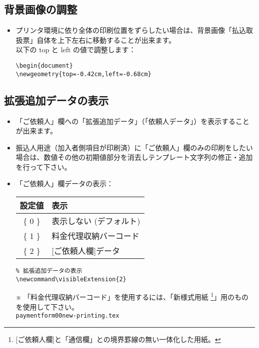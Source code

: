\documentclass[a4paper,10pt,titlepage]{ltjsarticle}
\def\colH#1{\color[HTML]{#1}}
\newcommand\visibleExtension{2}
\begin{document}
\subsection{背景画像の調整}
\begin{itemize}
  \item プリンタ環境に依り全体の印刷位置をずらしたい場合は、背景画像「払込取扱票」自体を上下左右に移動することが出来ます。\\
以下の {\colH{800000} top} と {\colH{800000} left} の値で調整します：
\begin{verbatim}
\begin{document}
\newgeometry{top=-0.42cm,left=-0.68cm}
\end{verbatim}
  
\end{itemize}

\subsection{拡張追加データの表示}

\begin{itemize}
   \item 「ご依頼人」欄への「拡張追加データ」（「依頼人データ」）を表示することが出来ます。   
   \item 振込人用途（加入者側項目が印刷済）に「ご依頼人」欄のみの印刷をしたい場合は、数値その他の初期値部分を消去しテンプレート文字列の修正・追加を行って下さい。
   \item 「ご依頼人」欄データの表示：
   \item[] 
\vspace{2mm}
\begin{tabular}{|c|l|}
\hline
\bfseries{設定値} & \hspace{40pt}\bfseries{表示}\\
\hline
\{ 0 \} & 表示しない (デフォルト)\\
\hline
\{ 1 \} & 料金代理収納バーコード\\
\hline
\{ 2 \} & [ご依頼人欄]データ\\
\hline
\end{tabular}
\vspace{2mm}
              
\begin{verbatim}
% 拡張追加データの表示
\newcommand\visibleExtension{2}
\end{verbatim}

   \item[※]「料金代理収納バーコード」を使用するには、「新様式用紙 \footnote{[ご依頼人欄]と「通信欄」との境界罫線の無い一体化した用紙。}」用のものを使用して下さい。\\ \verb|paymentform00new-printing.tex|

\end{itemize}
\end{document}
